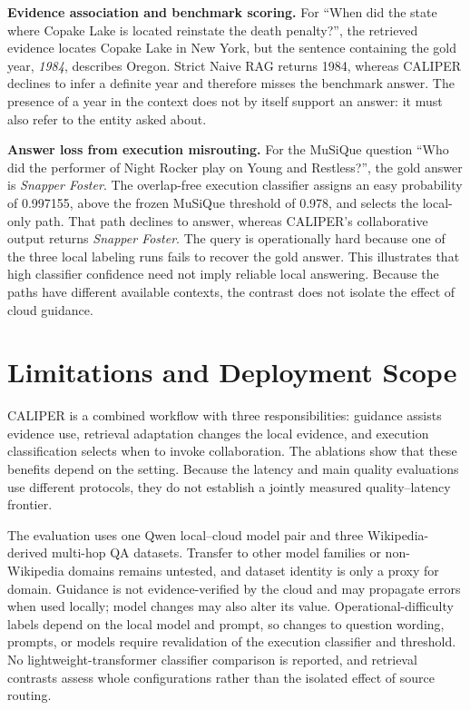 \documentclass[a4paper,fleqn]{cas-dc}
\begin{document}
\textbf{Evidence association and benchmark scoring.} For ``When did the state where Copake Lake is located reinstate the death penalty?'', the retrieved evidence locates Copake Lake in New York, but the sentence containing the gold year, \textit{1984}, describes Oregon. Strict Naive RAG returns 1984, whereas CALIPER declines to infer a definite year and therefore misses the benchmark answer. The presence of a year in the context does not by itself support an answer: it must also refer to the entity asked about.

\textbf{Answer loss from execution misrouting.} For the MuSiQue question ``Who did the performer of Night Rocker play on Young and Restless?'', the gold answer is \textit{Snapper Foster}. The overlap-free execution classifier assigns an easy probability of 0.997155, above the frozen MuSiQue threshold of 0.978, and selects the local-only path. That path declines to answer, whereas CALIPER's collaborative output returns \textit{Snapper Foster}. The query is operationally hard because one of the three local labeling runs fails to recover the gold answer. This illustrates that high classifier confidence need not imply reliable local answering. Because the paths have different available contexts, the contrast does not isolate the effect of cloud guidance.

\section{Limitations and Deployment Scope}
CALIPER is a combined workflow with three responsibilities: guidance assists evidence use, retrieval adaptation changes the local evidence, and execution classification selects when to invoke collaboration. The ablations show that these benefits depend on the setting. Because the latency and main quality evaluations use different protocols, they do not establish a jointly measured quality--latency frontier.

The evaluation uses one Qwen local--cloud model pair and three Wikipedia-derived multi-hop QA datasets. Transfer to other model families or non-Wikipedia domains remains untested, and dataset identity is only a proxy for domain. Guidance is not evidence-verified by the cloud and may propagate errors when used locally; model changes may also alter its value. Operational-difficulty labels depend on the local model and prompt, so changes to question wording, prompts, or models require revalidation of the execution classifier and threshold. No lightweight-transformer classifier comparison is reported, and retrieval contrasts assess whole configurations rather than the isolated effect of source routing.
\end{document}

